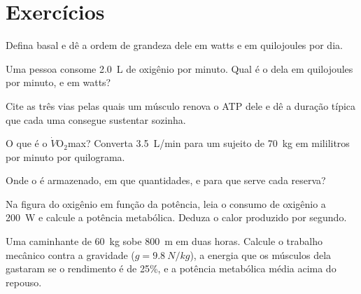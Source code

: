\section{Exercícios}

\begin{exercise}[$\star$]\label{exo:g10:exercise-and-energy:1}
Defina  basal e dê a ordem de grandeza dele em watts e em
quilojoules por dia.
\end{exercise}

\begin{exercise}[$\star$]\label{exo:g10:exercise-and-energy:2}
Uma pessoa consome \qty{2.0}{L} de oxigênio por minuto. Qual é o  dela em quilojoules por minuto, e em watts?
\end{exercise}

\begin{exercise}[$\star$]\label{exo:g10:exercise-and-energy:3}
Cite as três vias pelas quais um músculo renova o ATP dele e dê a
duração típica que cada uma consegue sustentar sozinha.
\end{exercise}

\begin{exercise}[$\star$]\label{exo:g10:exercise-and-energy:4}
O que é o $\dot V\!\mathrm{O_2}$max? Converta \qty{3.5}{L/min} para um
sujeito de \qty{70}{kg} em mililitros por minuto por quilograma.
\end{exercise}

\begin{exercise}[$\star$]\label{exo:g10:exercise-and-energy:5}
Onde o  é armazenado, em que quantidades, e para que serve
cada reserva?
\end{exercise}

\begin{exercise}[$\star\star$]\label{exo:g10:exercise-and-energy:6}
Na figura do oxigênio em função da potência, leia o consumo de oxigênio
a \qty{200}{W} e calcule a potência metabólica. Deduza o calor
produzido por segundo.
\end{exercise}

\begin{exercise}[$\star\star$]\label{exo:g10:exercise-and-energy:7}
Uma caminhante de \qty{60}{kg} sobe \qty{800}{m} em duas horas.
Calcule o trabalho mecânico contra a gravidade
($g = \qty{9.8}{N/kg}$), a energia que os músculos dela gastaram se o
rendimento é de 25\%, e a potência metabólica média acima do repouso.
\end{exercise}

